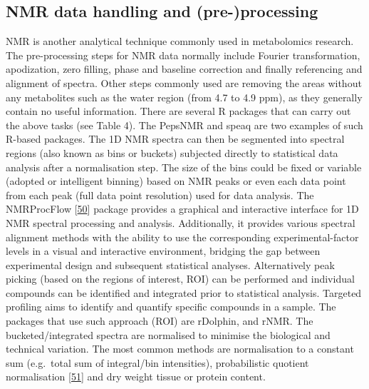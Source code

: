 \documentclass[]{article}
\begin{document}
\newpage

\hypertarget{nmr-data-handling-and-pre-processing}{%
\subsection{NMR data handling and (pre-)processing}\label{nmr-data-handling-and-pre-processing}}

NMR is another analytical technique commonly used in metabolomics research. The pre-processing steps for NMR data normally include Fourier transformation, apodization, zero filling, phase and baseline correction and finally referencing and alignment of spectra. Other steps commonly used are removing the areas without any metabolites such as the water region (from 4.7 to 4.9 ppm), as they generally contain no useful information. There are several R packages that can carry out the above tasks (see Table 4). The PepsNMR and speaq are two examples of such R-based packages. The 1D NMR spectra can then be segmented into spectral regions (also known as bins or buckets) subjected directly to statistical data analysis after a normalisation step. The size of the bins could be fixed or variable (adopted or intelligent binning) based on NMR peaks or even each data point from each peak (full data point resolution) used for data analysis. The NMRProcFlow {[}\protect\hyperlink{ref-jacob_2017}{50}{]} package provides a graphical and interactive interface for 1D NMR spectral processing and analysis. Additionally, it provides various spectral alignment methods with the ability to use the corresponding experimental-factor levels in a visual and interactive environment, bridging the gap between experimental design and subsequent statistical analyses. Alternatively peak picking (based on the regions of interest, ROI) can be performed and individual compounds can be identified and integrated prior to statistical analysis. Targeted profiling aims to identify and quantify specific compounds in a sample. The packages that use such approach (ROI) are rDolphin, and rNMR. The bucketed/integrated spectra are normalised to minimise the biological and technical variation. The most common methods are normalisation to a constant sum (e.g.~total sum of integral/bin intensities), probabilistic quotient normalisation {[}\protect\hyperlink{ref-dieterle_2006}{51}{]} and dry weight tissue or protein content.
\end{document}
